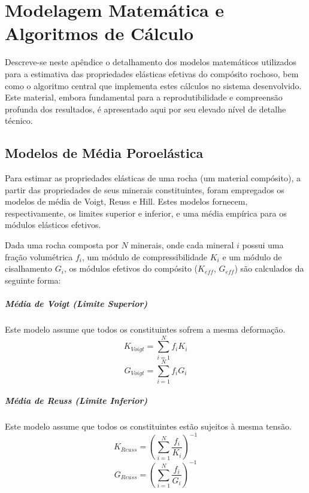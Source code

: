 \chapter{Modelagem Matemática e Algoritmos de Cálculo}
\rhead{\thepage}

Descreve-se neste apêndice o detalhamento dos modelos matemáticos utilizados para a estimativa das propriedades elásticas efetivas do compósito rochoso, bem como o algoritmo central que implementa estes cálculos no sistema desenvolvido. Este material, embora fundamental para a reprodutibilidade e compreensão profunda dos resultados, é apresentado aqui por seu elevado nível de detalhe técnico.

\section{Modelos de Média Poroelástica}

Para estimar as propriedades elásticas de uma rocha (um material compósito), a partir das propriedades de seus minerais constituintes, foram empregados os modelos de média de Voigt, Reuss e Hill. Estes modelos fornecem, respectivamente, os limites superior e inferior, e uma média empírica para os módulos elásticos efetivos.

Dada uma rocha composta por $N$ minerais, onde cada mineral $i$ possui uma fração volumétrica $f_i$, um módulo de compressibilidade $K_i$ e um módulo de cisalhamento $G_i$, os módulos efetivos do compósito ($K_{eff}$, $G_{eff}$) são calculados da seguinte forma:

\paragraph{Média de Voigt (Limite Superior)}
Este modelo assume que todos os constituintes sofrem a mesma deformação.
\begin{equation}
    K_{Voigt} = \sum_{i=1}^{N} f_i K_i
\end{equation}
\begin{equation}
    G_{Voigt} = \sum_{i=1}^{N} f_i G_i
\end{equation}

\paragraph{Média de Reuss (Limite Inferior)}
Este modelo assume que todos os constituintes estão sujeitos à mesma tensão.
\begin{equation}
    K_{Reuss} = \left( \sum_{i=1}^{N} \frac{f_i}{K_i} \right)^{-1}
\end{equation}
\begin{equation}
    G_{Reuss} = \left( \sum_{i=1}^{N} \frac{f_i}{G_i} \right)^{-1}
\end{equation}

